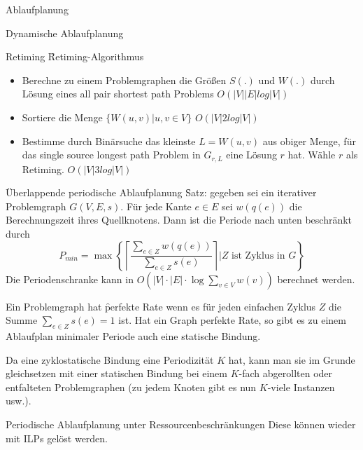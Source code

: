 \begin{chapter}{Ablaufplanung}
\begin{section}{Dynamische Ablaufplanung}
\begin{subsection}{Retiming}
    \f{Retiming-Algorithmus}
    \begin{itemize}
     \item Berechne zu einem Problemgraphen die Größen $S(.)$ und $W(.)$ durch Lösung eines all pair shortest path Problems $O(|V||E|log|V|)$
     \item Sortiere die Menge $\{ W(u,v) | u,v \in V \}$ $O(|V|2log|V|)$
     \item Bestimme durch Binärsuche das kleinste $L=W(u,v)$ aus obiger Menge, für das single source longest path Problem in $G_{r,L}$ eine Lösung $r$ hat. Wähle $r$ als Retiming. $O(|V|3log|V|)$
    \end{itemize}
   \end{subsection}
   
   \begin{subsection}{Überlappende periodische Ablaufplanung}
    \f{Satz:} gegeben sei ein iterativer Problemgraph $G(V,E,s)$. Für jede Kante $e\in E$ sei $w(q(e))$ die Berechnungszeit ihres Quellknotens. Dann ist die Periode nach unten beschränkt durch
     \[ P_{min} = \max \left\{ \left\lceil \frac{\sum_{e\in Z} w(q(e))}{\sum_{e\in Z} s(e)} \right\rceil \bigg | Z\text{ ist Zyklus in }G \right\} \]
     Die Periodenschranke kann in $O(|V|\cdot|E|\cdot \log \sum_{v\in V} w(v))$ berechnet werden.
     
     Ein Problemgraph hat \f{perfekte Rate} wenn es für jeden einfachen Zyklus $Z$ die Summe $\sum_{e\in Z} s(e) = 1$ ist. Hat ein Graph perfekte Rate, so gibt es zu einem Ablaufplan minimaler Periode auch eine statische Bindung.
     
     Da eine zyklostatische Bindung eine Periodizität $K$ hat, kann man sie im Grunde gleichsetzen mit einer statischen Bindung bei einem $K$-fach abgerollten oder entfalteten Problemgraphen (zu jedem Knoten gibt es nun $K$-viele Instanzen usw.).
   \end{subsection}
   
   \begin{subsection}{Periodische Ablaufplanung unter Ressourcenbeschränkungen}
    Diese können wieder mit ILPs gelöst werden.
    

\end{subsection}
\end{section}
\end{chapter}
